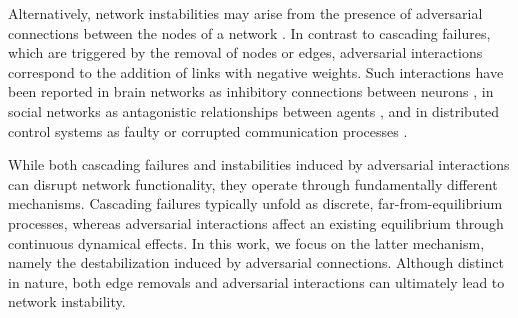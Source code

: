 \documentclass[%
 reprint,
 amsmath,amssymb,
 aip,
]{revtex4-2}
\theoremstyle{italichead}
\theoremstyle{definition}
\begin{document}
Alternatively, network instabilities may arise from the presence of adversarial connections between the nodes of a network \cite{Altafini2013Consensus,Chen2017spectral,ahmadizadeh2017eigenvalues}. In contrast to cascading failures, which are triggered by the removal of nodes or edges, adversarial interactions correspond to the addition of links with negative weights. Such interactions have been reported in brain networks as inhibitory connections between neurons \cite{ahmadizadeh2017eigenvalues}, in social networks as antagonistic relationships between agents \cite{Altafini2013Consensus}, and in distributed control systems as faulty or corrupted communication processes \cite{Chen2017spectral}.

While both cascading failures \cite{Buldyrev_2010,reis2014avoiding,albert2000error,PhysRevE.66.065102} and instabilities induced by adversarial interactions can disrupt network functionality, they operate through fundamentally different mechanisms. Cascading failures typically unfold as discrete, far-from-equilibrium processes, whereas adversarial interactions affect an existing equilibrium through continuous dynamical effects. 
In this work, we focus on the latter mechanism, namely the destabilization induced by adversarial connections. Although distinct in nature, both edge removals and adversarial interactions can ultimately lead to network instability.




\end{document}
